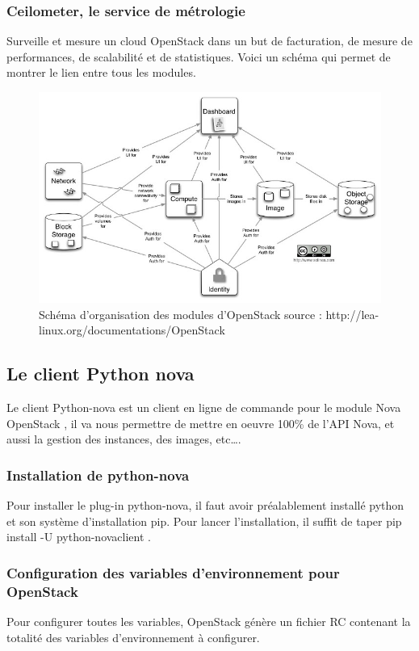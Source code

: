 \documentclass[]{article}
\begin{document}
\subsubsection{Ceilometer, le service de
métrologie}\label{ceilometer-le-service-de-muxe9trologie}
Surveille et mesure un cloud OpenStack dans un but de facturation, de
mesure de performances, de scalabilité et de statistiques.
Voici un schéma qui permet de montrer le lien entre tous les modules.
\begin{figure}
\centering
\includegraphics{Images/Openstack_diagramme_conceptuel.jpg}
\caption{Schéma d'organisation des modules d'OpenStack \footnotesize{source : http://lea-linux.org/documentations/OpenStack} }
\end{figure}

\subsection{Le client Python nova}\label{le-client-python-nova}
Le client Python-nova est un client en ligne de commande pour le module
Nova OpenStack , il va nous permettre de mettre en oeuvre 100\% de l'API
Nova, et aussi la gestion des instances, des images, etc\ldots{}.

\subsubsection{Installation de
python-nova}\label{installation-de-python-nova}
Pour installer le plug-in python-nova, il faut avoir préalablement
installé python et son système d'installation pip. Pour lancer
l'installation, il suffit de taper pip install -U python-novaclient .

\subsubsection{Configuration des variables d'environnement pour
OpenStack}\label{configuration-des-variables-denvironnement-pour-OpenStack}
Pour configurer toutes les variables, OpenStack génère un fichier RC
contenant la totalité des variables d'environnement à configurer.
\end{document}
